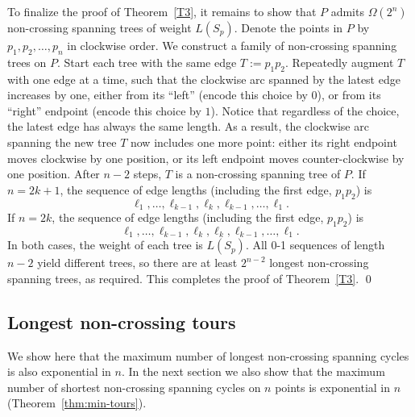 \documentclass[11pt]{article}
\begin{document}
To finalize the proof of Theorem~\ref{T3}, it remains to show that $P$ admits
$\Omega(2^{n})$ non-crossing spanning trees of weight $L(S_p)$.
Denote the points in $P$ by $p_1, p_2, \ldots, p_n$ in clockwise order.
We construct a family of non-crossing spanning trees on $P$. Start each
tree with the same edge $T := p_1 p_2$. Repeatedly augment $T$ with one
edge at a time, such that the clockwise arc spanned by the latest edge increases by one,
either from its ``left'' (encode this choice by $0$), or from its ``right''
endpoint (encode this choice by $1$). Notice that regardless of the choice,
the latest edge has always the same length. As a result, the clockwise arc
spanning the new tree $T$ now includes one more point: either its right
endpoint moves clockwise by one position, or its left endpoint moves
counter-clockwise by one position. After $n-2$ steps, $T$ is a non-crossing
spanning tree of $P$. If $n=2k+1$, the sequence of edge lengths (including
the first edge, $p_1 p_2$) is
$$ \ell_1,\ldots,\ell_{k-1},\ell_k,\ell_{k-1},\ldots,\ell_1. $$
If $n=2k$, the sequence of edge lengths (including the first edge,
$p_1 p_2$) is
$$ \ell_1,\ldots,\ell_{k-1},\ell_k,\ell_k,\ell_{k-1},\ldots,\ell_1. $$
In both cases, the weight of each tree is $L(S_p)$.
All 0-1 sequences of length $n-2$ yield different trees, so there are at
least $2^{n-2}$ longest non-crossing spanning trees, as required.
This completes the proof of Theorem~\ref{T3}.
\qed

\subsection{Longest non-crossing tours}

We show here that the maximum number of longest non-crossing
spanning cycles is also exponential in $n$.
In the next section we also show that the maximum number of shortest
non-crossing spanning cycles on $n$ points is exponential in $n$
(Theorem~\ref{thm:min-tours}).
\end{document}
